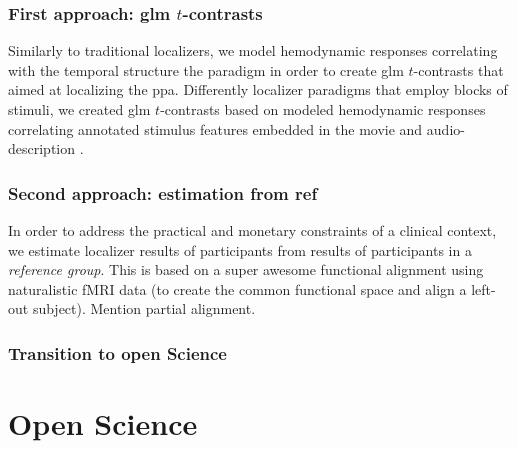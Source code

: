 \subsubsection{First approach: \ac{glm} $t$-contrasts}


Similarly to traditional localizers, we model hemodynamic responses correlating
with the temporal structure the paradigm in order to create \ac{glm}
$t$-contrasts that aimed at localizing the \ac{ppa}.
%
Differently localizer paradigms that employ blocks of stimuli, we created
\ac{glm} $t$-contrasts based on modeled hemodynamic responses correlating
annotated stimulus features embedded in the movie \citep{haeusler2016cutanno}
and audio-description \citep{haeusler2021speechanno}.


\subsubsection{Second approach: estimation from ref}


%
In order to address the practical and monetary constraints of a clinical
context, we estimate localizer results of participants from results of
participants in a \textit{reference group}.
%
This is based on a super awesome functional alignment using naturalistic fMRI
data (to create the common functional space and align a left-out subject).
%
Mention partial alignment.



\subsubsection{Transition to open Science}






\section{Open Science}

